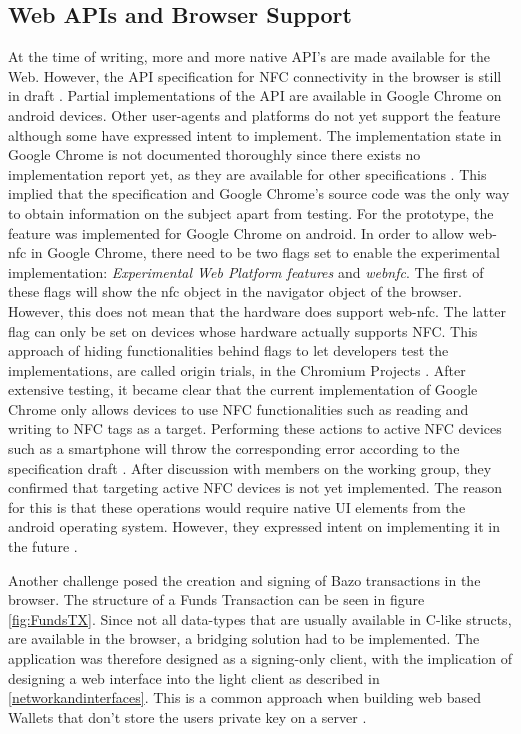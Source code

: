 \subsection{Web APIs and Browser Support}\label{browsersupport}
At the time of writing, more and more native API's are made available for the Web.
However, the API specification for NFC connectivity in the browser is still in draft \cite{webnfc}. Partial implementations of the API are available in Google Chrome on android devices. Other user-agents and platforms do not yet support the feature although some have expressed intent to implement. The implementation state in Google Chrome is not documented thoroughly since there exists no implementation report yet, as they are available for other specifications \cite{localstoragetest}\cite{webnfc}. This implied that the specification and Google Chrome's source code was the only way to obtain information on the subject apart from testing.
For the prototype, the feature was implemented for Google Chrome on android.
In order to allow web-nfc in Google Chrome, there need to be two flags set to enable the experimental implementation: \textit{Experimental Web Platform features} and \textit{webnfc}. The first of these flags will show the nfc object in the navigator object of the browser. However, this does not mean that the hardware does support web-nfc. The latter flag can only be set on devices whose hardware actually supports NFC. This approach of hiding functionalities behind flags to let developers test the implementations, are called origin trials, in the Chromium Projects \cite{origintrials}.
After extensive testing, it became clear that the current implementation of Google Chrome only allows devices to use NFC functionalities such as reading and writing to NFC tags as a target. Performing these actions to active NFC devices such as a smartphone will throw the corresponding error according to the specification draft \cite{webnfc}. After discussion with members on the working group, they confirmed that targeting active NFC devices is not yet implemented. The reason for this is that these operations would require native UI elements from the android operating system. However, they expressed intent on implementing it in the future \cite{webnfcpeer}.

Another challenge posed the creation and signing of Bazo transactions in the browser. The structure of a Funds Transaction can be seen in figure \ref{fig:FundsTX}. Since not all data-types that are usually available in C-like structs, are available in the browser, a bridging solution had to be implemented. The application was therefore designed as a signing-only client, with the implication of designing a web interface into the light client as described in \ref{networkandinterfaces}. This is a common approach when building web based Wallets that don't store the users private key on a server \cite{bitcoinclients}\cite{masteringbitcoin}.

